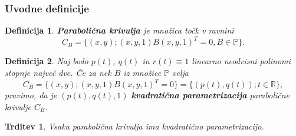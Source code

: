 \documentclass{beamer}
\def\R{\mathbb{R}} %
\newcommand{\PP}{\mathbb P}
\newtheorem{trditev}{Trditev}
\newtheorem{definicija}{Definicija}
\begin{document}

\begin{frame}
\frametitle{Uvodne definicije}

\pause


\begin{definicija}
\textbf{Parabolična krivulja} je množica točk v ravnini 
\begin{equation*}\label{implicitna}
 C_B = \{ (x,y); (x,y,1) B (x, y, 1)^T = 0, B \in \PP \}.
 \end{equation*}
\end{definicija}

\pause

\begin{definicija}
Naj bodo $p(t)$, $q(t)$ in $r(t) \equiv 1$ linearno neodvisni polinomi stopnje največ dve. Če za nek $B$ iz množice $\PP$ velja 
$$ C_B = \{ (x,y); (x,y,1) B (x, y, 1)^T = 0 \} = \{ (p(t), q(t)); t \in \R \},$$
pravimo, da je $( p(t), q(t), 1)$ \textbf{kvadratična parametrizacija} parabolične krivulje $C_B$.
\end{definicija}

\pause

\begin{trditev}\label{vsakaparabola}
Vsaka parabolična krivulja ima kvadratično parametrizacijo.
\end{trditev}

\end{frame}

\end{document}
